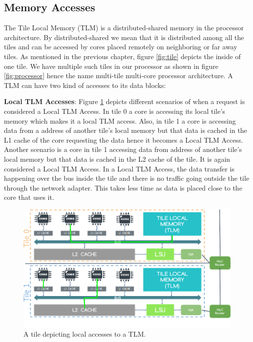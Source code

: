 \documentclass{listhesis}
\begin{document}
\subsection{Memory Accesses}
The Tile Local Memory (TLM) is a distributed-shared memory in the processor architecture. By distributed-shared we mean that it is distributed among all the tiles and can be accessed by cores placed remotely on neighboring or far away tiles. As mentioned in the previous chapter, figure \ref{fig:tile} depicts the inside of one tile. We have multiple such tiles in our processor as shown in figure \ref{fig:processor} hence the name multi-tile multi-core processor architecture. A TLM can have two kind of accesses to its data blocks:\\
\par
\textbf{Local TLM Accesses}: Figure \ref{fig:localaccesses} depicts different scenarios of when a request is considered a Local TLM Access. In tile 0 a core is accessing its local tile's memory which makes it a local TLM access. Also, in tile 1 a core is accessing data from a address of another tile's local memory but that data is cached in the L1 cache of the core requesting the data hence it becomes a Local TLM Access. Another scenario is a core in tile 1 accessing data from address of another tile's local memory but that data is cached in the L2 cache of the tile. It is again considered a Local TLM Access. In a Local TLM Access, the data transfer is happening over the bus inside the tile and there is no traffic going outside the tile through the network adapter. This takes less time as data is placed close to the core that uses it. \\
\begin{figure}
  \includegraphics[width=\linewidth]{localaccesses.png}
  \centering
  \caption{A tile depicting local accesses to a TLM.}
  \label{fig:localaccesses}
\end{figure}
\end{document}
